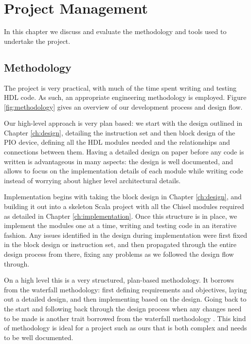 \chapter{Project Management}

In this chapter we discuss and evaluate the methodology and tools used to undertake the project.

\section{Methodology}
The project is very practical, with much of the time spent writing and testing HDL code. As such, an appropriate engineering methodology is employed. Figure \ref{fig:methodology} gives an overview of our development process and design flow.

Our high-level approach is very plan based: we start with the design outlined in Chapter \ref{ch:design}, detailing the instruction set and then block design of the PIO device, defining all the HDL modules needed and the relationships and connections between them. Having a detailed design on paper before any code is written is advantageous in many aspects: the design is well documented, and allows to focus on the implementation details of each module while writing code instead of worrying about higher level architectural details.

Implementation begins with taking the block design in Chapter \ref{ch:design}, and building it out into a skeleton Scala project with all the Chisel modules required as detailed in Chapter \ref{ch:implementation}. Once this structure is in place, we implement the modules one at a time, writing and testing code in an iterative fashion. Any issues identified in the design during implementation were first fixed in the block design or instruction set, and then propagated through the entire design process from there, fixing any problems as we followed the design flow through.

On a high level this is a very structured, plan-based methodology. It borrows from the waterfall methodology: first defining requirements and objectives, laying out a detailed design, and then implementing based on the design. Going back to the start and following back through the design process when any changes need to be made is another trait borrowed from the waterfall methodology \cite{softeng}. This kind of methodology is ideal for a project such as ours that is both complex and needs to be well documented.

